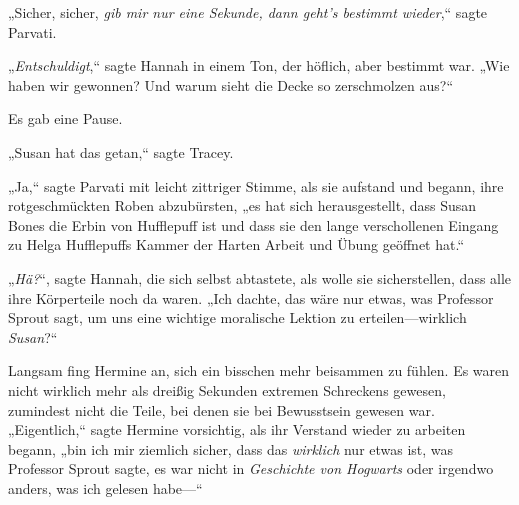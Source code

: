 „Sicher, sicher, \emph{gib mir nur eine Sekunde, dann geht's bestimmt wieder},“ sagte Parvati.

„\emph{Entschuldigt},“ sagte Hannah in einem Ton, der höflich, aber bestimmt war. „Wie haben wir gewonnen? Und warum sieht die Decke so zerschmolzen aus?“

Es gab eine Pause.

„Susan hat das getan,“ sagte Tracey.

„Ja,“ sagte Parvati mit leicht zittriger Stimme, als sie aufstand und begann, ihre rotgeschmückten Roben abzubürsten, „es hat sich herausgestellt, dass Susan Bones die Erbin von Hufflepuff ist und dass sie den lange verschollenen Eingang zu Helga Hufflepuffs Kammer der Harten Arbeit und Übung geöffnet hat.“

„\emph{Hä?}“, sagte Hannah, die sich selbst abtastete, als wolle sie sicherstellen, dass alle ihre Körperteile noch da waren. „Ich dachte, das wäre nur etwas, was Professor Sprout sagt, um uns eine wichtige moralische Lektion zu erteilen—wirklich \emph{Susan}?“

Langsam fing Hermine an, sich ein bisschen mehr beisammen zu fühlen. Es waren nicht wirklich mehr als dreißig Sekunden extremen Schreckens gewesen, zumindest nicht die Teile, bei denen sie bei Bewusstsein gewesen war. „Eigentlich,“ sagte Hermine vorsichtig, als ihr Verstand wieder zu arbeiten begann, „bin ich mir ziemlich sicher, dass das \emph{wirklich} nur etwas ist, was Professor Sprout sagte, es war nicht in \emph{Geschichte von Hogwarts} oder irgendwo anders, was ich gelesen habe—“

